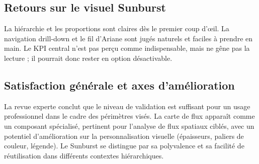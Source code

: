 \subsection{Retours sur le visuel Sunburst}

La hiérarchie et les proportions sont claires dès le premier coup d’œil. 
La navigation drill-down et le fil d’Ariane sont jugés naturels et faciles à prendre en main. 
Le KPI central n’est pas perçu comme indispensable, mais ne gêne pas la lecture ; 
il pourrait donc rester en option désactivable.

\subsection{Satisfaction générale et axes d’amélioration}

La revue experte conclut que le niveau de validation est suffisant pour un usage professionnel 
dans le cadre des périmètres visés. 
La carte de flux apparaît comme un composant spécialisé, pertinent pour l’analyse de flux spatiaux ciblés, 
avec un potentiel d’amélioration sur la personnalisation visuelle (épaisseurs, paliers de couleur, légende). 
Le Sunburst se distingue par sa polyvalence et sa facilité de réutilisation dans différents contextes hiérarchiques.
